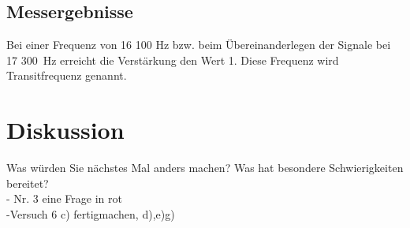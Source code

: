 \documentclass[a4paper,12pt]{article}
\begin{document}
\subsection{Messergebnisse}
\begin{table}[H]
	\centering
{}
	\caption{Frequenzgang des aktiven Tiefpasses}
\end{table}
Bei einer Frequenz von 16 100 Hz bzw. beim Übereinanderlegen der Signale bei 17 300~Hz erreicht die Verstärkung den Wert 1. Diese Frequenz wird Transitfrequenz genannt.


























\section{Diskussion}
Was würden Sie nächstes Mal anders machen? Was hat besondere Schwierigkeiten bereitet?\\

- Nr. 3 eine Frage in rot\\
-Versuch 6 c) fertigmachen, d),e)g)
\end{document}
